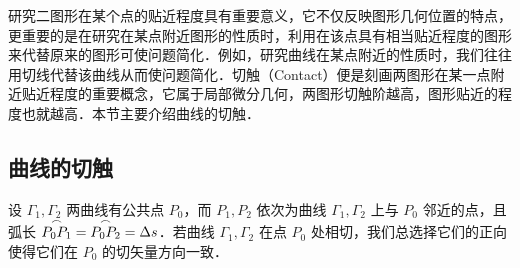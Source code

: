 
研究二图形在某个点的贴近程度具有重要意义，它不仅反映图形几何位置的特点，更重要的是在研究在某点附近图形的性质时，利用在该点具有相当贴近程度的图形来代替原来的图形可使问题简化．例如，研究曲线在某点附近的性质时，我们往往用切线代替该曲线从而使问题简化．切触（Contact）便是刻画两图形在某一点附近贴近程度的重要概念，它属于局部微分几何，两图形切触阶越高，图形贴近的程度也就越高．本节主要介绍曲线的切触．
\subsection{曲线的切触}
设 $\Gamma_1,\Gamma_2$ 两曲线有公共点 $P_0$，而 $P_1,P_2$ 依次为曲线 $\Gamma_1,\Gamma_2$ 上与 $P_0$ 邻近的点，且弧长 $\overset{\Huge\frown}{P_0P_1}=\overset{\Huge\frown}{P_0P_2}=\Delta s$．若曲线  $\Gamma_1,\Gamma_2$ 在点 $P_0$ 处相切，我们总选择它们的正向使得它们在 $P_0$ 的切矢量方向一致．